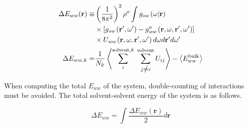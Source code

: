 \documentclass[9pt,tutorial]{livecoms}
\renewcommand{\neq}{\setbox0\hbox{=}\rlap{\hbox to \wd0{\hss /\hss}}\box0}
\begin{document}

\begin{equation}
\begin{aligned}
	\Delta E_{ww}(\textbf{r}) \equiv & \left(\frac{1}{8\pi^2} \right)^2 \rho^o \int g_\textit{sw}\left(\omega|\textbf{r}\right) \\
	& \times \left[g_\textit{sw}\left(\textbf{r}^\prime , \omega^\prime \right) - g^o_\textit{ww} \left(\textbf{r}, \omega, \textbf{r}^\prime, \omega^\prime \right)\right] \\
	& \times U_\textit{ww}\left(\textbf{r}, \omega, \textbf{r}^\prime, \omega^\prime\right)d\omega d\textbf{r}^\prime d\omega^\prime \\
	\Delta E_{ww,k} =& \frac{1}{N_k} \left\langle \sum_i^{\text{solvent},k} \; \sum_{j \neq i}^\text{solvent} U_{ij}\right\rangle - \left\langle E_{ww}^\text{bulk}\right\rangle
\end{aligned}
\end{equation}



When computing the total $E_{ww}$ of the system, double-counting of interactions must be avoided.
The total solvent-solvent energy of the system is as follows.

\begin{equation}
\Delta E_{ww} = \int \frac{\Delta E_{ww}(\textbf{r})}{2} d\textbf{r}
\end{equation}
\end{document}
